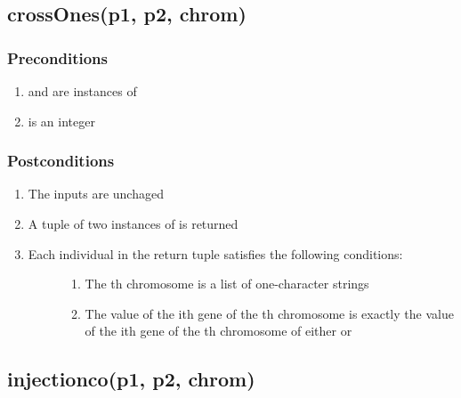 \documentclass[letterpaper,10pt,english]{sphinxmanual}
\begin{document}
\subsection{crossOnes(p1, p2, chrom)}
\label{contracts:crossones-p1-p2-chrom}

\subsubsection{Preconditions}
\label{contracts:id35}\begin{enumerate}
\item {} 
 and  are instances of 

\item {} 
 is an integer

\end{enumerate}


\subsubsection{Postconditions}
\label{contracts:id36}\begin{enumerate}
\item {} 
The inputs are unchaged

\item {} 
A tuple of two instances of  is returned

\item {} \begin{description}
\item[{Each individual in the return tuple satisfies the following conditions:}] \leavevmode\begin{enumerate}
\item {} 
The  th chromosome is a list of one-character strings

\item {} 
The value of the ith gene of the  th chromosome is exactly the value of the ith gene of the  th chromosome of either  or 

\end{enumerate}

\end{description}

\end{enumerate}


\subsection{injectionco(p1, p2, chrom)}
\label{contracts:injectionco-p1-p2-chrom}
\end{document}
